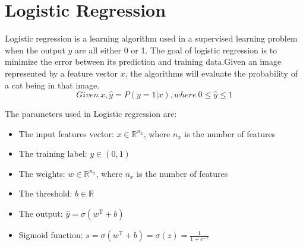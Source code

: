 \documentclass[a4paper]{article}
\begin{document}
\section{Logistic Regression}
Logistic regression is a learning algorithm used in a supervised learning
problem when the output $y$ are all either 0 or 1. The goal of logistic regression
is to minimize the error between its prediction and training data.Given an image
represented by a feature vector $x$, the algorithms will evaluate the probability
of a cat being in that image.
\begin{equation}
Given \ x, \hat{y}=P\left(y=1|x\right),where \ 0\leq\hat{y}\leq1
\end{equation}
\par
The parameters used in Logistic regression are:
\begin{itemize}
  \item The input features vector: $x \in \mathbb{R}^{n_x}$, where $n_x$ is the number of features
  \item The training label: $y\in\left(0,1\right)$
  \item The weights: $w\in \mathbb{R}^{n_x}$, where $n_x$ is the number of features
  \item The threshold: $b \in \mathbb{R}$
  \item The output: $\hat{y}=\sigma\left(w^\mathrm{T}+b\right)$
  \item Sigmoid function: $s = \sigma\left(w^\mathrm{T}+b\right)=\sigma\left(z\right) = \frac{1}{1+e^{-z}}$
\end{itemize}




\end{document}
